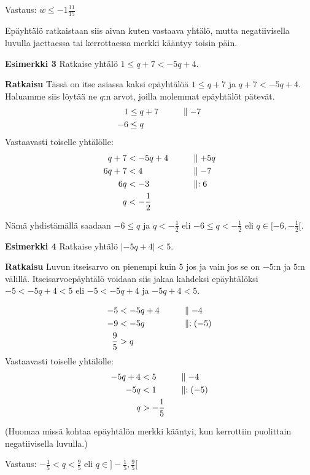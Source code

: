 Vastaus: $w\leq -1\frac{11}{15}$

Epäyhtälö ratkaistaan siis aivan kuten vastaava yhtälö, mutta negatiivisella luvulla
jaettaessa tai kerrottaessa merkki kääntyy toisin päin.

\textbf{Esimerkki 3}
Ratkaise yhtälö $1\leq q+7<-5q+4$.

\textbf{Ratkaisu}
Tässä on itse asiassa kaksi epäyhtälöä $1\leq q+7$ ja $q+7<-5q+4$. Haluamme siis löytää ne $q$:n arvot, joilla molemmat epäyhtälöt pätevät.
\begin{align*}
1&\leq q+7 \ \ \ \ \ &&\parallel -7 \\
-6&\leq q
\end{align*}
Vastaavasti toiselle yhtälölle:
\begin{align*}
q+7&<-5q+4  \ \ \ \ \ &&\parallel +5q \\
6q+7&<4 &&\parallel -7 \\
6q&<-3 &&\parallel :6 \\
q&< -\frac12 \\
\end{align*}

Nämä yhdistämällä saadaan $-6\leq q$ ja $q< -\frac12$ eli $-6\leq q < -\frac12$ eli $q\in [-6, -\frac12[$.

\textbf{Esimerkki 4}
Ratkaise yhtälö $|-5q+4|<5$.

\textbf{Ratkaisu}
Luvun itseisarvo on pienempi kuin $5$ jos ja vain jos se on $-5$:n ja $5$:n välillä.
Itseisarvoepäyhtälö voidaan siis jakaa kahdeksi epäyhtälöksi $-5<-5q+4<5$ eli $-5<-5q+4$ ja $-5q+4<5$.

\begin{align*}
-5&<-5q+4 \ \ \ \ \ &&\parallel -4 \\
-9&<-5q &&\parallel :(-5) \\
\frac95&>q
\end{align*}
Vastaavasti toiselle yhtälölle:
\begin{align*}
-5q+4&<5  \ \ \ \ \ &&\parallel -4 \\
-5q&<1 &&\parallel :(-5) \\
q&>-\frac15 \\
\end{align*}

(Huomaa missä kohtaa epäyhtälön merkki kääntyi, kun kerrottiin puolittain negatiivisella luvulla.)

Vastaus: $-\frac15<q<\frac95$ eli $q\in ]-\frac15,\frac95[$

